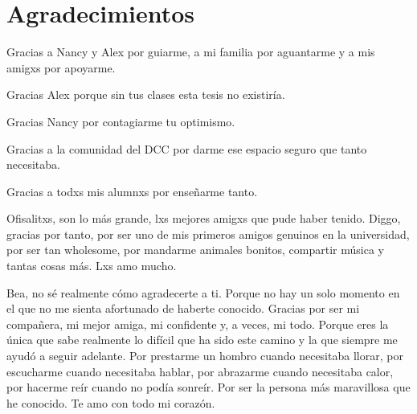 \section*{Agradecimientos}
  Gracias a Nancy y Alex por guiarme, a mi familia por aguantarme y a mis amigxs por apoyarme.

  Gracias Alex porque sin tus clases esta tesis no existiría.

  Gracias Nancy por contagiarme tu optimismo.

  Gracias a la comunidad del DCC por darme ese espacio seguro que tanto necesitaba.

  Gracias a todxs mis alumnxs por enseñarme tanto.


  Ofisalitxs, son lo más grande, lxs mejores amigxs que pude haber tenido.
  Diggo, gracias por tanto, por ser uno de mis primeros amigos genuinos en la universidad, por
  ser tan wholesome, por mandarme animales bonitos, compartir música y tantas cosas más.
  Lxs amo mucho.

  Bea, no sé realmente cómo agradecerte a ti.
  Porque no hay un solo momento en el que no me sienta afortunado de haberte conocido.
  Gracias por ser mi compañera, mi mejor amiga, mi confidente y, a veces, mi todo.
  Porque eres la única que sabe realmente lo difícil que ha sido este camino y la que siempre me
  ayudó a seguir adelante.
  Por prestarme un hombro cuando necesitaba llorar, por escucharme cuando necesitaba hablar, por
  abrazarme cuando necesitaba calor, por hacerme reír cuando no podía sonreír.
  Por ser la persona más maravillosa que he conocido.
  Te amo con todo mi corazón.